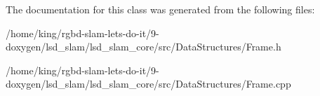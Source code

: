 The documentation for this class was generated from the following files\-:\begin{DoxyCompactItemize}
\item 
/home/king/rgbd-\/slam-\/lets-\/do-\/it/9-\/doxygen/lsd\-\_\-slam/lsd\-\_\-slam\-\_\-core/src/\-Data\-Structures/Frame.\-h\item 
/home/king/rgbd-\/slam-\/lets-\/do-\/it/9-\/doxygen/lsd\-\_\-slam/lsd\-\_\-slam\-\_\-core/src/\-Data\-Structures/Frame.\-cpp\end{DoxyCompactItemize}
